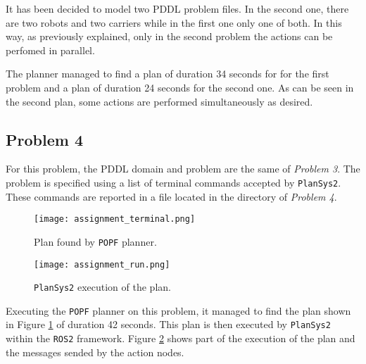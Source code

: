 It has been decided to model two PDDL problem files.
In the second one, there are two robots and two carriers while in the first one only one of both.
In this way, as previously explained, only in the second problem the actions can be perfomed in parallel.

The planner managed to find a plan of duration 34 seconds for for the first problem and a plan of
duration 24 seconds for the second one.
As can be seen in the second plan, some actions are performed simultaneously as desired.

\subsection{Problem 4}
For this problem, the PDDL domain and problem are the same of \textit{Problem 3}.
The problem is specified using a list of terminal commands accepted by \texttt{PlanSys2}.
These commands are reported in a file located in the directory of \textit{Problem 4}.


\begin{figure}[t]
\centerline{\texttt{[image: assignment\_terminal.png]}}
\caption{Plan found by \texttt{POPF} planner.}
\label{fig:plan}
\end{figure}
    
\begin{figure}[t]
\centerline{\texttt{[image: assignment\_run.png]}}
\caption{\texttt{PlanSys2} execution of the plan.}
\label{fig:execution}
\end{figure}

Executing the \texttt{POPF} planner on this problem, it managed to find the plan shown in Figure 
\ref{fig:plan} of duration 42 seconds.
This plan is then executed by \texttt{PlanSys2} within the \texttt{ROS2} framework. 
Figure \ref{fig:execution} shows part of the execution of the plan and the messages sended by the action nodes.
